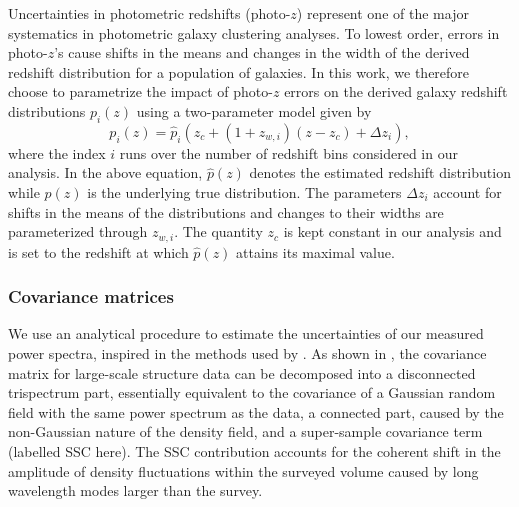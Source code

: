 \documentclass[a4paper,11pt]{article}
\begin{document}
Uncertainties in photometric redshifts (photo-$z$) represent one of the major systematics in photometric galaxy clustering analyses. To lowest order, errors in photo-$z$'s cause shifts in the means and changes in the width of the derived redshift distribution for a population of galaxies. In this work, we therefore choose to parametrize the impact of photo-$z$ errors on the derived galaxy redshift distributions $p_{i}(z)$ using a two-parameter model given by
\begin{equation}
p_{i}(z) = \hat{p}_{i}(z_{c} + (1 + z_{w, i})(z-z_{c}) + \Delta z_{i}),
\label{eq:photo-z-model}
\end{equation} 
where the index $i$ runs over the number of redshift bins considered in our analysis.
In the above equation, $\hat{p}(z)$ denotes the estimated redshift distribution while $p(z)$ is the underlying true distribution. The parameters $\Delta z_{i}$ account for shifts in the means of the distributions and changes to their widths are parameterized through $z_{w, i}$. The quantity $z_{c}$ is kept constant in our analysis and is set to the redshift at which $\hat{p}(z)$ attains its maximal value.
    
  \subsubsection{Covariance matrices}\label{sssec:methods.theory.covar}
    We use an analytical procedure to estimate the uncertainties of our measured power spectra, inspired in the methods used by \cite{Krause:2017}. As shown in \cite{2009MNRAS.395.2065T,Takada:2013}, the covariance matrix for large-scale structure data can be decomposed into a disconnected trispectrum part, essentially equivalent to the covariance of a Gaussian random field with the same power spectrum as the data, a connected part, caused by the non-Gaussian nature of the density field, and a super-sample covariance term (labelled SSC here). The SSC contribution accounts for the coherent shift in the amplitude of density fluctuations within the surveyed volume caused by long wavelength modes larger than the survey.
    
\end{document}
